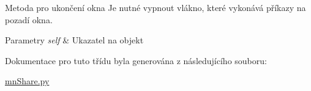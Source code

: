 Metoda pro ukončení okna Je nutné vypnout vlákno, které vykonává příkazy na pozadí okna. 


\begin{DoxyParams}{Parametry}
{\em self} & Ukazatel na objekt \\
\hline
\end{DoxyParams}


Dokumentace pro tuto třídu byla generována z následujícího souboru\-:\begin{DoxyCompactItemize}
\item 
\hyperlink{mnShare_8py}{mn\-Share.\-py}\end{DoxyCompactItemize}
